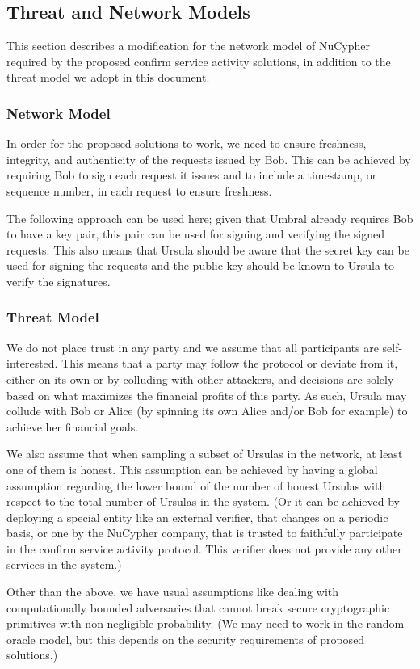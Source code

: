\subsection{Threat and Network Models}
\label{threat-network-model}
This section describes a modification for the network model of NuCypher 
required by the proposed confirm service activity solutions, in 
addition to the threat model we adopt in this document.


\subsubsection{Network Model}
In order for the proposed solutions to work, we need to ensure freshness, 
integrity, and authenticity of the requests issued by Bob. This can be achieved 
by requiring Bob to sign each request it issues and to include a timestamp, or 
sequence number, in each request to ensure freshness.


The following approach can be used here; given that Umbral already requires Bob to 
have a key pair, this pair can be used for signing and verifying the signed requests. 
This also means that Ursula should be aware that the secret key can be used for
signing the requests and the public 
key should be known to Ursula to verify the signatures. 


\subsubsection{Threat Model}
We do not place trust in any party and we assume that all participants are 
self-interested. This means that a party may 
follow the protocol or deviate from it, either on its own or by colluding 
with other attackers, and decisions are solely based on what maximizes the financial profits
of this party. As such, Ursula may collude with Bob or Alice (by spinning 
its own Alice and/or Bob for example) to achieve her financial goals. 


We also assume that when sampling a subset of Ursulas in the network, 
at least one of them is honest. This assumption can be achieved by 
having a global assumption regarding the lower bound of the number of 
honest Ursulas with respect to the total number of Ursulas in the system. 
(Or it can be achieved by deploying a special entity like an external verifier, 
that changes on a periodic basis, or one by the NuCypher company, that is
trusted to faithfully participate in the confirm 
service activity protocol. This verifier does not provide any other services 
in the system.)


Other than the above, we have usual assumptions like dealing with 
computationally bounded adversaries 
that cannot break secure cryptographic primitives with non-negligible probability. 
(We may need to work in the random oracle model, but this depends on the 
security requirements of proposed solutions.)

